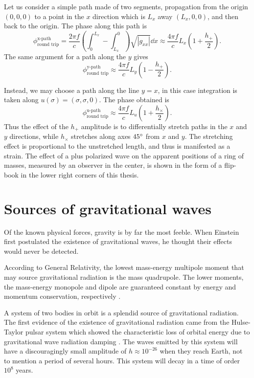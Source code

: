 Let us consider a simple path made of two segments, propagation from the origin $(0,0,0)$ to a point in the $x$ direction which is $L_x$ away $(L_x,0,0)$, and then back to the origin. %
The phase along this path is
\begin{equation}
\phi_{\text{round trip}}^{\text{x-path}}= \frac{2\pi f}{c} \left(\int_0^{L_x}-\int^0_{L_x}\right)\sqrt{|g_{xx}|}\dd x \approx \frac{4\pi f}{c} L_x \left(1+\frac{h_+}{2}\right).
\end{equation} 
The same argument for a path along the $y$ gives
\begin{equation}
\phi_{\text{round trip}}^{\text{y-path}} \approx \frac{4\pi f}{c} L_y \left(1-\frac{h_+}{2}\right).
\end{equation} 

Instead, we may choose a path along the line $y=x$, in this case integration is taken along $ u(\sigma) = (\sigma,\sigma,0)$. %
The phase obtained is
\begin{equation}
\phi_{\text{round trip}}^{\text{u-path}} \approx \frac{4\pi f}{c} L_u \left(1+\frac{h_\times}{2}\right).
\end{equation} 
Thus the effect of the $h_+$ amplitude is to differentially stretch paths in the $x$ and $y$ directions, while $h_\times$ stretches along axes $45 ^\circ$ from $x$ and $y$. %
The stretching effect is proportional to the unstretched length, and thus is manifested as a strain. %
The effect of a plus polarized wave on the apparent positions of a ring of masses, measured by an observer in the center, is shown in the form of a flip-book in the lower right corners of this thesis.

\section{Sources of gravitational waves}
Of the known physical forces, gravity is by far the most feeble. %
When Einstein first postulated the existence of gravitational waves, he thought their effects would never be detected.

According to General Relativity, the lowest mass-energy multipole moment that may source gravitational radiation is the mass quadrupole. %
The lower moments, the mass-energy monopole and dipole are guaranteed constant by energy and momentum conservation, respectively \cite[Section 7.5]{carroll2004spacetime}.

A system of two bodies in orbit is a splendid source of gravitational radiation. %
The first evidence of the existence of gravitational radiation came from the Hulse-Taylor pulsar system which showed the characteristic loss of orbital energy due to gravitational wave radiation damping \cite{Taylor1979}. %
The waves emitted by this system will have a discouragingly small amplitude of $h\approx 10^{-26}$ when they reach Earth, not to mention a period of several hours. %
This system will decay in a time of order $10^8$ years.

